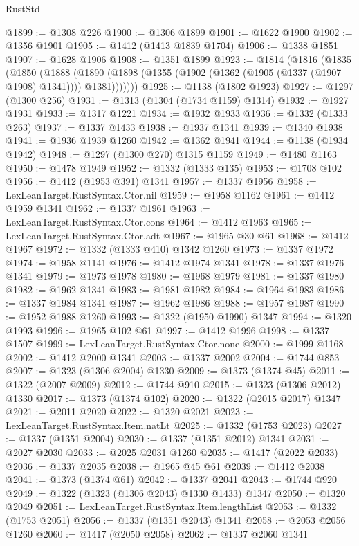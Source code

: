 \begin{lexlean}{RustStd}
\begin{coremodule}
{\begin{coremodule}
{{{{{{{{{{{{{{{{{{{{{{{{{{{{{{{{{{@1899 := @1308 @226
@1900 := @1306 @1899
@1901 := @1622 @1900
@1902 := @1356 @1901
@1905 := @1412 (@1413 @1839 @1704)
@1906 := @1338 @1851
@1907 := @1628 @1906
@1908 := @1351 @1899
@1923 := @1814
    (@1816
      (@1835
        (@1850
          (@1888
            (@1890 (@1898 (@1355 (@1902 (@1362 (@1905 (@1337 (@1907 @1908) @1341)))) @1381)))))))
@1925 := @1138 (@1802 @1923)
@1927 := @1297 (@1300 @256)
@1931 := @1313 (@1304 (@1734 @1159) @1314)
@1932 := @1927 @1931
@1933 := @1317 @1221
@1934 := @1932 @1933
@1936 := @1332 (@1333 @263)
@1937 := @1337 @1433
@1938 := @1937 @1341
@1939 := @1340 @1938
@1941 := @1936 @1939 @1260
@1942 := @1362 @1941
@1944 := @1138 (@1934 @1942)
@1948 := @1297 (@1300 @270) @1315 @1159
@1949 := @1480 @1163
@1950 := @1478 @1949
@1952 := @1332 (@1333 @135)
@1953 := @1708 @102
@1956 := @1412 (@1953 @391) @1341
@1957 := @1337 @1956
@1958 := LexLeanTarget.RustSyntax.Ctor.nil
@1959 := @1958 @1162
@1961 := @1412 @1959 @1341
@1962 := @1337 @1961
@1963 := LexLeanTarget.RustSyntax.Ctor.cons
@1964 := @1412 @1963
@1965 := LexLeanTarget.RustSyntax.Ctor.adt
@1967 := @1965 @30 @61
@1968 := @1412 @1967
@1972 := @1332 (@1333 @410) @1342 @1260
@1973 := @1337 @1972
@1974 := @1958 @1141
@1976 := @1412 @1974 @1341
@1978 := @1337 @1976 @1341
@1979 := @1973 @1978
@1980 := @1968 @1979
@1981 := @1337 @1980
@1982 := @1962 @1341
@1983 := @1981 @1982
@1984 := @1964 @1983
@1986 := @1337 @1984 @1341
@1987 := @1962 @1986
@1988 := @1957 @1987
@1990 := @1952 @1988 @1260
@1993 := @1322 (@1950 @1990) @1347
@1994 := @1320 @1993
@1996 := @1965 @102 @61
@1997 := @1412 @1996
@1998 := @1337 @1507
@1999 := LexLeanTarget.RustSyntax.Ctor.none
@2000 := @1999 @1168
@2002 := @1412 @2000 @1341
@2003 := @1337 @2002
@2004 := @1744 @853
@2007 := @1323 (@1306 @2004) @1330
@2009 := @1373 (@1374 @45)
@2011 := @1322 (@2007 @2009)
@2012 := @1744 @910
@2015 := @1323 (@1306 @2012) @1330
@2017 := @1373 (@1374 @102)
@2020 := @1322 (@2015 @2017) @1347
@2021 := @2011 @2020
@2022 := @1320 @2021
@2023 := LexLeanTarget.RustSyntax.Item.natLt
@2025 := @1332 (@1753 @2023)
@2027 := @1337 (@1351 @2004)
@2030 := @1337 (@1351 @2012) @1341
@2031 := @2027 @2030
@2033 := @2025 @2031 @1260
@2035 := @1417 (@2022 @2033)
@2036 := @1337 @2035
@2038 := @1965 @45 @61
@2039 := @1412 @2038
@2041 := @1373 (@1374 @61)
@2042 := @1337 @2041
@2043 := @1744 @920
@2049 := @1322 (@1323 (@1306 @2043) @1330 @1433) @1347
@2050 := @1320 @2049
@2051 := LexLeanTarget.RustSyntax.Item.lengthList
@2053 := @1332 (@1753 @2051)
@2056 := @1337 (@1351 @2043) @1341
@2058 := @2053 @2056 @1260
@2060 := @1417 (@2050 @2058)
@2062 := @1337 @2060 @1341
}}}}}}}}}}}}}}}}}}}}}}}}}}}}}}}}}}
\end{coremodule}}
\end{coremodule}
\end{lexlean}
